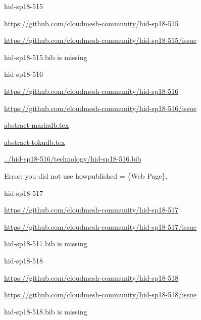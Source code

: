 \begin{IU}

hid-sp18-515

\url{https://github.com/cloudmesh-community/hid-sp18-515}

\url{https://github.com/cloudmesh-community/hid-sp18-515/issue}

hid-sp18-515.bib is missing

\end{IU}


\begin{IU}

hid-sp18-516

\url{https://github.com/cloudmesh-community/hid-sp18-516}

\url{https://github.com/cloudmesh-community/hid-sp18-516/issue}

\href{https://github.com/cloudmesh-community/hid-sp18-516/blob/master//technology/abstract-mariadb.tex}{abstract-mariadb.tex}

\href{https://github.com/cloudmesh-community/hid-sp18-516/blob/master//technology/abstract-tokudb.tex}{abstract-tokudb.tex}

\href{https://github.com/cloudmesh-community/hid-sp18-516/blob/master//technology/hid-sp18-516.bib}{../hid-sp18-516/technology/hid-sp18-516.bib}

Error: you did not use howpublished = \{Web Page\},

\end{IU}


\begin{IU}

hid-sp18-517

\url{https://github.com/cloudmesh-community/hid-sp18-517}

\url{https://github.com/cloudmesh-community/hid-sp18-517/issue}

hid-sp18-517.bib is missing

\end{IU}


\begin{IU}

hid-sp18-518

\url{https://github.com/cloudmesh-community/hid-sp18-518}

\url{https://github.com/cloudmesh-community/hid-sp18-518/issue}

hid-sp18-518.bib is missing

\end{IU}


